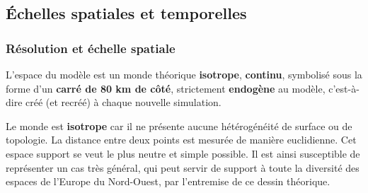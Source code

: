 


\clearpage

\subsection{Échelles spatiales et temporelles}
\mbox{}
\subsubsection{Résolution et échelle spatiale \label{subsec:reso-spatiale}}
L'espace du modèle est un monde théorique \textbf{isotrope}, \textbf{continu}, symbolisé sous la forme d'un \textbf{carré de 80 km de côté}, strictement \textbf{endogène} au modèle, c'est-à-dire créé (et recréé) à chaque nouvelle simulation.

Le monde est \textbf{isotrope} car il ne présente aucune hétérogénéité de surface ou de topologie.
La distance entre deux points est mesurée de manière euclidienne.
Cet espace support se veut le plus neutre et simple possible.
Il est ainsi susceptible de représenter un cas très général, qui peut servir de support à toute la diversité des espaces de l'Europe du Nord-Ouest, par l'entremise de ce dessin théorique.


